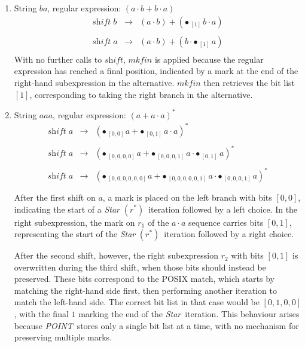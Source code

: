 \documentclass[12pt]{article}
\newcommand{\shift}{\textit{shift}}
\newcommand{\Star}{\textit{Star}}
\newcommand{\Marked}[1]{\bullet\,#1}
\newcommand{\POINT}{\textit{POINT}}
\newcommand{\mkfin}{\textit{mkfin}}
\newcommand{\STARText}{\textit{Star} $(r^*)$}
\begin{document}
\begin{enumerate}
  \item String $ba$, regular expression: $(a \cdot b + b \cdot a)$
  \[
    \begin{array}{rcl}
      \shift\; b & \rightarrow & (a \cdot b) + (\Marked{_{[1]}\, b} \cdot a)\\\\
      \shift\; a & \rightarrow & (a \cdot b) + (b \cdot \Marked{_{[1]}\, a} )\\
    \end{array}
  \]
  With no further calls to $\shift$, $\mkfin$ is applied because the regular expression 
  has reached a final position, indicated by a mark at the end of the right-hand subexpression in 
  the alternative. $\mkfin$ then retrieves the bit list $[1]$, corresponding to taking the 
  right branch in the alternative.

  \item String $aaa$, regular expression: $(a + a \cdot a)^*$
  \[
    \begin{array}{rcl}
      \shift\; a & \rightarrow & ( \Marked{_{[0,0]\,} a} +  \Marked{_{[0,1]}\,a \cdot a} )^*\\\\
      \shift\; a & \rightarrow & ( \Marked{_{[0,0,0,0]\,} a} +  \Marked{_{[0,0,0,1]}\,a \cdot \Marked{_{[0,1]}\,a} } )^*\\\\ 
      \shift\; a & \rightarrow & ( \Marked{_{[0,0,0,0,0,0]\,} a} +  \Marked{_{[0,0,0,0,0,1]}\,a \cdot \Marked{_{[0,0,0,1]}\,a} } )^*\\\\
    \end{array}
  \]
  After the first shift on $a$, a mark is placed on the left branch with bits $[0,0]$,  
  indicating the start of a \STARText\ iteration followed by a left choice.  
  In the right subexpression, the mark on $r_1$ of the $a \cdot a$ sequence carries bits $[0,1]$,  
  representing the start of the \STARText\ iteration followed by a right choice.  

  After the second shift, however, the right subexpression $r_2$ with bits $[0,1]$ is overwritten during 
  the third shift, when those bits should instead be preserved.  
  These bits correspond to the POSIX match, which starts by matching the right-hand side first,  
  then performing another iteration to match the left-hand side.  
  The correct bit list in that case would be $[0,1,0,0]$, with the final $1$ marking the end of the \Star\ iteration.  
  This behaviour arises because \POINT\ stores only a single bit list at a time, with no mechanism for preserving multiple marks.  

\end{enumerate}
\end{document}
